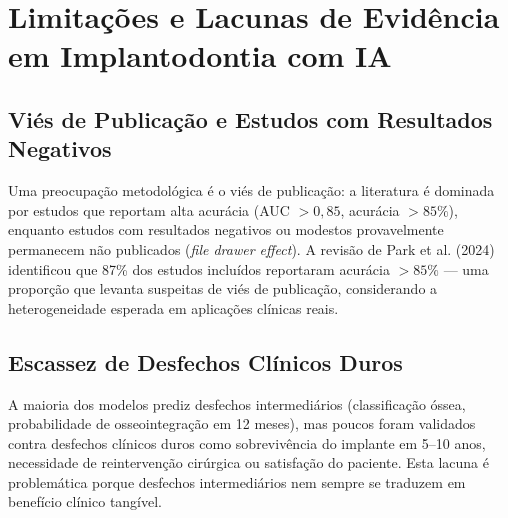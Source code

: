 
\section{Limitações e Lacunas de Evidência em Implantodontia com IA}

\subsection{Viés de Publicação e Estudos com Resultados Negativos}

Uma preocupação metodológica é o viés de publicação: a literatura é dominada por estudos que reportam alta acurácia (AUC $>0,85$, acurácia $>85\%$), enquanto estudos com resultados negativos ou modestos provavelmente permanecem não publicados (\textit{file drawer effect}). A revisão de Park et al. (2024) identificou que 87\% dos estudos incluídos reportaram acurácia $>85\%$ --- uma proporção que levanta suspeitas de viés de publicação, considerando a heterogeneidade esperada em aplicações clínicas reais.

\subsection{Escassez de Desfechos Clínicos Duros}

A maioria dos modelos prediz desfechos intermediários (classificação óssea, probabilidade de osseointegração em 12 meses), mas poucos foram validados contra desfechos clínicos duros como sobrevivência do implante em 5--10 anos, necessidade de reintervenção cirúrgica ou satisfação do paciente. Esta lacuna é problemática porque desfechos intermediários nem sempre se traduzem em benefício clínico tangível.


